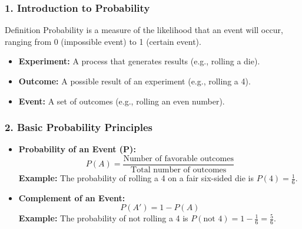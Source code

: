 \documentclass[aspectratio=169]{beamer}
\begin{document}
\begin{frame}[fragile]
    \frametitle{1. Introduction to Probability}
    \begin{block}{Definition}
        Probability is a measure of the likelihood that an event will occur, ranging from 0 (impossible event) to 1 (certain event).
    \end{block}
    
    \begin{itemize}
        \item \textbf{Experiment:} A process that generates results (e.g., rolling a die).
        \item \textbf{Outcome:} A possible result of an experiment (e.g., rolling a 4).
        \item \textbf{Event:} A set of outcomes (e.g., rolling an even number).
    \end{itemize}
\end{frame}

\begin{frame}[fragile]
    \frametitle{2. Basic Probability Principles}
    \begin{itemize}
        \item \textbf{Probability of an Event (P):} 
        \begin{equation}
        P(A) = \frac{\text{Number of favorable outcomes}}{\text{Total number of outcomes}}
        \end{equation}
        \textbf{Example:} The probability of rolling a 4 on a fair six-sided die is \( P(4) = \frac{1}{6} \).
        
        \item \textbf{Complement of an Event:}
        \begin{equation}
        P(A') = 1 - P(A)
        \end{equation}
        \textbf{Example:} The probability of not rolling a 4 is \( P(\text{not 4}) = 1 - \frac{1}{6} = \frac{5}{6} \).
    \end{itemize}
\end{frame}
\end{document}

